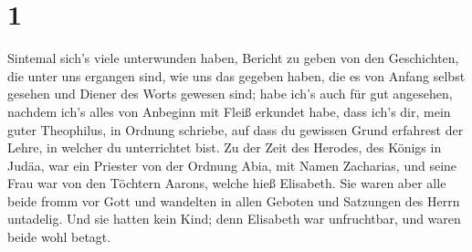 \hypertarget{section}{%
\section{1}\label{section}}

 Sintemal sich's viele unterwunden haben, Bericht zu geben
von den Geschichten, die unter uns ergangen sind,  wie uns
das gegeben haben, die es von Anfang selbst gesehen und Diener des Worts
gewesen sind;  habe ich's auch für gut angesehen, nachdem
ich's alles von Anbeginn mit Fleiß erkundet habe, dass ich's dir, mein
guter Theophilus, in Ordnung schriebe,  auf dass du
gewissen Grund erfahrest der Lehre, in welcher du unterrichtet bist.
 Zu der Zeit des Herodes, des Königs in Judäa, war ein
Priester von der Ordnung Abia, mit Namen Zacharias, und seine Frau war
von den Töchtern Aarons, welche hieß Elisabeth.  Sie waren
aber alle beide fromm vor Gott und wandelten in allen Geboten und
Satzungen des Herrn untadelig.  Und sie hatten kein Kind;
denn Elisabeth war unfruchtbar, und waren beide wohl betagt.


